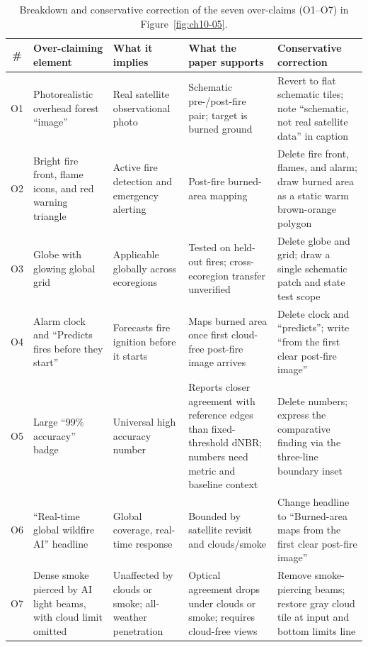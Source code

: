 \begin{table}[htbp]\centering\footnotesize
\setlength{\tabcolsep}{3pt}
\renewcommand{\arraystretch}{1.12}
\caption{Breakdown and conservative correction of the seven over-claims (O1--O7) in Figure~\ref{fig:ch10-05}.}\label{tab:ch10-05-overclaim}
\begin{tabularx}{\linewidth}{@{}c>{\raggedright\arraybackslash}p{25mm}>{\raggedright\arraybackslash}p{25mm}>{\raggedright\arraybackslash}p{26mm}Y@{}}
\toprule
\textbf{\#} & \textbf{Over-claiming element} & \textbf{What it implies} & \textbf{What the paper supports} & \textbf{Conservative correction} \\
\midrule
O1 & Photorealistic overhead forest ``image'' & Real satellite observational photo & Schematic pre-/post-fire pair; target is burned ground & Revert to flat schematic tiles; note ``schematic, not real satellite data'' in caption \\
O2 & Bright fire front, flame icons, and red warning triangle & Active fire detection and emergency alerting & Post-fire burned-area mapping & Delete fire front, flames, and alarm; draw burned area as a static warm brown-orange polygon \\
O3 & Globe with glowing global grid & Applicable globally across ecoregions & Tested on held-out fires; cross-ecoregion transfer unverified & Delete globe and grid; draw a single schematic patch and state test scope \\
O4 & Alarm clock and ``Predicts fires before they start'' & Forecasts fire ignition before it starts & Maps burned area once first cloud-free post-fire image arrives & Delete clock and ``predicts''; write ``from the first clear post-fire image'' \\
O5 & Large ``99\% accuracy'' badge & Universal high accuracy number & Reports closer agreement with reference edges than fixed-threshold dNBR; numbers need metric and baseline context & Delete numbers; express the comparative finding via the three-line boundary inset \\
O6 & ``Real-time global wildfire AI'' headline & Global coverage, real-time response & Bounded by satellite revisit and clouds/smoke & Change headline to ``Burned-area maps from the first clear post-fire image'' \\
O7 & Dense smoke pierced by AI light beams, with cloud limit omitted & Unaffected by clouds or smoke; all-weather penetration & Optical agreement drops under clouds or smoke; requires cloud-free views & Remove smoke-piercing beams; restore gray cloud tile at input and bottom limits line \\
\bottomrule
\end{tabularx}
\end{table}

